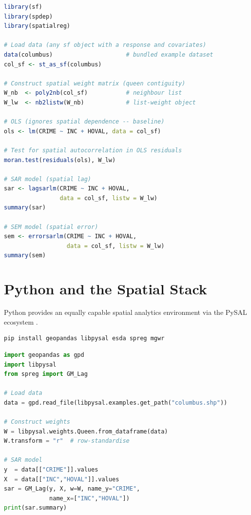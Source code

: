 \begin{lstlisting}[language=R,
  caption={Spatial lag model with spdep and spatialreg}]
library(sf)
library(spdep)
library(spatialreg)

# Load data (any sf object with a response and covariates)
data(columbus)                     # bundled example dataset
col_sf <- st_as_sf(columbus)

# Construct spatial weight matrix (queen contiguity)
W_nb  <- poly2nb(col_sf)           # neighbour list
W_lw  <- nb2listw(W_nb)            # list-weight object

# OLS (ignores spatial dependence -- baseline)
ols <- lm(CRIME ~ INC + HOVAL, data = col_sf)

# Test for spatial autocorrelation in OLS residuals
moran.test(residuals(ols), W_lw)

# SAR model (spatial lag)
sar <- lagsarlm(CRIME ~ INC + HOVAL,
                data = col_sf, listw = W_lw)
summary(sar)

# SEM model (spatial error)
sem <- errorsarlm(CRIME ~ INC + HOVAL,
                  data = col_sf, listw = W_lw)
summary(sem)
\end{lstlisting}

\section{Python and the Spatial Stack}

Python provides an equally capable spatial analytics environment via the
PySAL ecosystem \citep{Rey2010}.

\begin{lstlisting}[language=Python,
  caption={Installing core spatial libraries (Python)}]
pip install geopandas libpysal esda spreg mgwr
\end{lstlisting}

\begin{lstlisting}[language=Python,
  caption={Spatial lag model with spreg (Python equivalent)}]
import geopandas as gpd
import libpysal
from spreg import GM_Lag

# Load data
data = gpd.read_file(libpysal.examples.get_path("columbus.shp"))

# Construct weights
W = libpysal.weights.Queen.from_dataframe(data)
W.transform = "r"  # row-standardise

# SAR model
y  = data[["CRIME"]].values
X  = data[["INC","HOVAL"]].values
sar = GM_Lag(y, X, w=W, name_y="CRIME",
             name_x=["INC","HOVAL"])
print(sar.summary)
\end{lstlisting}

